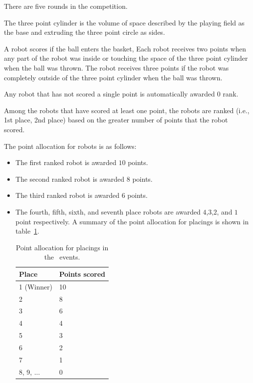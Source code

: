 \documentclass[12pt]{hurocup}
\begin{document}
\label{basketball-scoring}

\begin{lawlist}[BB]

\item There are five rounds in the competition.

\item The three point cylinder is the volume of space described by the
 playing field as the base and extruding the three point circle
 as sides. 

\item A robot scores if the ball enters the basket, Each robot
 receives two points when any part of the robot was inside or touching
 the space of the three point cylinder when the ball was thrown. The
 robot receives three points if the robot was completely outside of
 the three point cylinder when the ball was thrown.

\item Any robot that has not scored a single point is automatically
  awarded 0 rank.

\item Among the robots that have scored at least one point, the robots
  are ranked (i.e., 1st place, 2nd place) based on the greater number
  of points that the robot scored.

\item The point allocation for robots is as follows:
  \begin{itemize}
  \item The first ranked robot is awarded $10$ points.
  \item The second ranked robot is awarded $8$ points.
  \item The third ranked robot is awarded $6$ points.
  \item The fourth, fifth, sixth, and seventh place robots are awarded
    $4$,$3$,$2$, and $1$ point respectively.  A summary of the point
    allocation for placings is shown in table~\ref{point-allocation}.

    \begin{table}
      \begin{center}
        \begin{tabular}{l|l}
          \hline
          Place & Points scored \\
          \hline
          1 (Winner) & 10 \\
          2          & 8 \\
          3          & 6 \\
          4          & 4 \\
          5          & 3 \\
          6          & 2 \\
          7          & 1 \\
          8, 9, ...  & 0 \\
          \hline
        \end{tabular}
      \end{center}
      \caption{Point allocation for placings in the \HuroCup\ events.}
      \label{point-allocation}
    \end{table}
 \end{itemize}


\end{lawlist}
\end{document}
